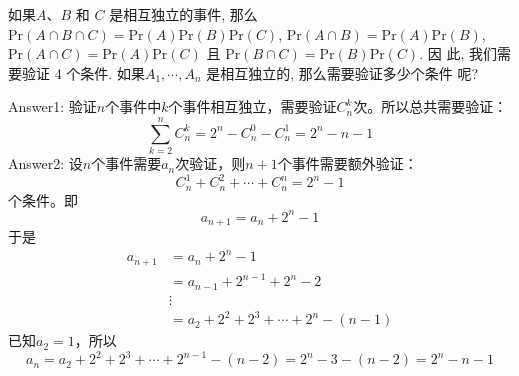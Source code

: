\exer 如果$A$、$B$ 和 $C$ 是相互独立的事件, 那么$\mathrm{Pr}(A \cap B \cap C) = \mathrm{Pr}(A)\mathrm{Pr}(B)\mathrm{Pr}(C)$,
$\mathrm{Pr}(A \cap B) = \mathrm{Pr}(A)\mathrm{Pr}(B)$, $\mathrm{Pr}(A \cap C) = \mathrm{Pr}(A)\mathrm{Pr}(C)$ 且 $\mathrm{Pr}(B \cap C) = \mathrm{Pr}(B)\mathrm{Pr}(C)$. 因 此, 我们需要验证 4 个条件. 如果$A_1 ,\cdots , A_n$ 是相互独立的, 那么需要验证多少个条件 呢?\par
Answer1: 验证$n$个事件中$k$个事件相互独立，需要验证$C_n^k$次。所以总共需要验证：
\[\sum_{k=2}^n C_n^k=2^n-C_n^0-C_n^1=2^n-n-1\]
Answer2: 设$n$个事件需要$a_n$次验证，则$n+1$个事件需要额外验证：
\[C_n^1 + C_n^2 + \cdots + C_n^n = 2^n - 1\]
个条件。即
\[a_{n+1}=a_n+2^n - 1\]
于是
\begin{align*}
    a_{n+1}&=a_n+2^n - 1 \\
    &= a_{n-1} + 2^{n-1} +2^n  - 2 \\
    &\vdots \\
    &=a_{2} + 2^2+2^3+\cdots+2^n - (n-1)
\end{align*}
已知$a_2=1$，所以
\[a_{n}=a_{2} + 2^2+2^3+\cdots+2^{n-1} - (n-2)=2^n-3-(n-2)=2^n-n-1\]